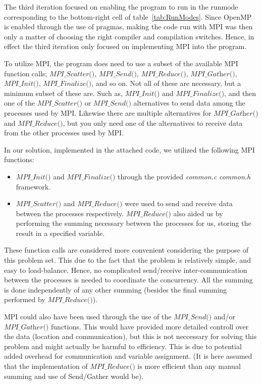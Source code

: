 \documentclass[fontsize=11pt,paper=a4,titlepage]{report}
\begin{document}


The third iteration focused on enabling the program to run in the runmode
corresponding to the bottom-right cell of table~\ref{tab:RunModes}.
Since OpenMP is enabled through the use of pragmas, making the code run with MPI
was then only a matter of choosing the right compiler and compilation switches.
Hence, in effect the third iteration only focused on implementing MPI into the
program.

To utilize MPI, the program does need to use a subset of the available MPI
function calls; $\textit{MPI\_Scatter()}$, $\textit{MPI\_Send()}$,
$\textit{MPI\_Reduce()}$, $\textit{MPI\_Gather()}$, $\textit{MPI\_Init()}$,
$\textit{MPI\_Finalize()}$, and so on. Not all of these are necessary, but a
minimum subset of these are. Such as, $\textit{MPI\_Init()}$ and $\textit{
MPI\_Finalize()}$, and then one of the $\textit{MPI\_Scatter()}$ or
$\textit{MPI\_Send()}$ alternatives to send data among the processes used by
MPI. Likewise there are multiple alternatives for $\textit{MPI\_Gather()}$ and
$\textit{MPI\_Reduce()}$, but you only need one of the alternatives to receive
data from the other processes used by MPI.

In our solution, implemented in the attached code, we utilized the following MPI
functions:

\begin{itemize}
	\item{$\textit{MPI\_Init()}$ and $\textit{
MPI\_Finalize()}$ through the provided \textit{common.c} \textit{common.h}
framework.}
	\item{$\textit{MPI\_Scatter()}$ and $\textit{MPI\_Reduce()}$ were used to
send and receive data between the processes respectively.
$\textit{MPI\_Reduce()}$ also aided us by performing the summing necessary
between the processes for us, storing the result in a specified variable.}
\end{itemize}

These function calls are considered more convenient considering the purpose of
this problem set. This due to the fact that the problem is relatively simple,
and easy to load-balance. Hence, no complicated send/receive inter-communication
between the processes is needed to coordinate the concurrency. All the summing
is done independently of any other summing (besides the final summing performed
by $\textit{MPI\_Reduce()}$).

MPI could also have been used through the use of the $\textit{MPI\_Send()}$
and/or $\textit{MPI\_Gather()}$ functions. This would have provided more
detailed controll over the data (location and communication), but this is not
neccessary for solving this problem and might actually be harmful to efficiency.
This is due to potential added overhead for communication and variable
assignment. (It is here assumed that the implementation of
$\textit{MPI\_Reduce()}$ is more efficient than any manual summing and use of
Send/Gather would be).
\end{document}
